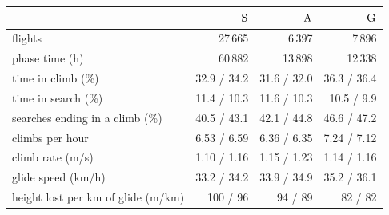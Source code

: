 \begin{tabular}{@{}l r r r@{}}
\toprule
 & $\mathrm{S}$ & $\mathrm{A}$ & $\mathrm{G}$ \\
\midrule
flights & 27\,665 & 6\,397 & 7\,896 \\
phase time (h) & 60\,882 & 13\,898 & 12\,338 \\
time in climb (\%) & 32.9 / 34.2 & 31.6 / 32.0 & 36.3 / 36.4 \\
time in search (\%) & 11.4 / 10.3 & 11.6 / 10.3 & 10.5 / 9.9 \\
searches ending in a climb (\%) & 40.5 / 43.1 & 42.1 / 44.8 & 46.6 / 47.2 \\
climbs per hour & 6.53 / 6.59 & 6.36 / 6.35 & 7.24 / 7.12 \\
climb rate (m/s) & 1.10 / 1.16 & 1.15 / 1.23 & 1.14 / 1.16 \\
glide speed (km/h) & 33.2 / 34.2 & 33.9 / 34.9 & 35.2 / 36.1 \\
height lost per km of glide (m/km) & 100 / 96 & 94 / 89 & 82 / 82 \\
\bottomrule
\end{tabular}
